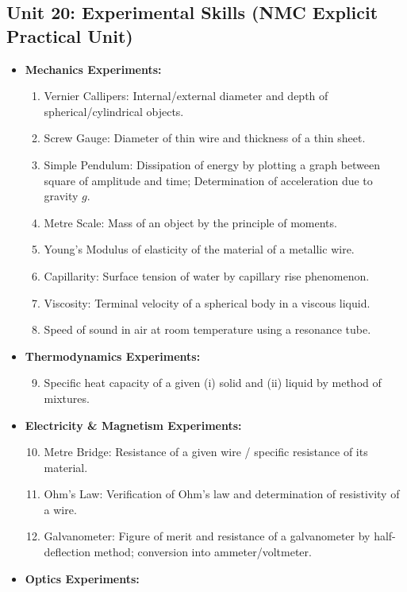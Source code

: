 \documentclass[11pt,a4paper]{article}
\begin{document}
\subsection{Unit 20: Experimental Skills (NMC Explicit Practical Unit)}
\begin{itemize}
  \item \textbf{Mechanics Experiments:}
  \begin{enumerate}
    \item Vernier Callipers: Internal/external diameter and depth of spherical/cylindrical objects.
    \item Screw Gauge: Diameter of thin wire and thickness of a thin sheet.
    \item Simple Pendulum: Dissipation of energy by plotting a graph between square of amplitude and time; Determination of acceleration due to gravity $g$.
    \item Metre Scale: Mass of an object by the principle of moments.
    \item Young's Modulus of elasticity of the material of a metallic wire.
    \item Capillarity: Surface tension of water by capillary rise phenomenon.
    \item Viscosity: Terminal velocity of a spherical body in a viscous liquid.
    \item Speed of sound in air at room temperature using a resonance tube.
  \end{enumerate}
  \item \textbf{Thermodynamics Experiments:}
  \begin{enumerate}
    \setcounter{enumi}{8}
    \item Specific heat capacity of a given (i) solid and (ii) liquid by method of mixtures.
  \end{enumerate}
  \item \textbf{Electricity \& Magnetism Experiments:}
  \begin{enumerate}
    \setcounter{enumi}{9}
    \item Metre Bridge: Resistance of a given wire / specific resistance of its material.
    \item Ohm's Law: Verification of Ohm's law and determination of resistivity of a wire.
    \item Galvanometer: Figure of merit and resistance of a galvanometer by half-deflection method; conversion into ammeter/voltmeter.
  \end{enumerate}
  \item \textbf{Optics Experiments:}

\end{itemize}
\end{document}
